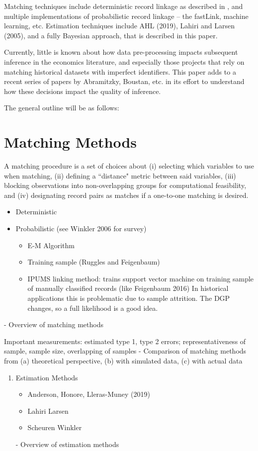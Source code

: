 \documentclass[12pt]{article}
\begin{document}
\begin{Introduction}
Matching techniques include deterministic record linkage as described in \cite{}, and multiple implementations of probabilistic record linkage -- the fastLink, machine learning, etc. Estimation techniques include AHL (2019), Lahiri and Larsen (2005), and a fully Bayesian approach, that is described in this paper. 

Currently, little is known about how data pre-processing impacts subsequent inference in the economics literature, and especially those projects that rely on matching historical datasets with imperfect identifiers.  This paper adds to a recent series of papers by Abramitzky, Boustan, etc.  in its effort to understand how these decisions impact the quality of inference. 

The general outline will be as follows:


\section{Matching Methods}

A matching procedure is a set of choices about (i) selecting which variables to use when matching, (ii) defining a ``distance" metric between said variables, (iii) blocking observations into non-overlapping groups for computational feasibility, and (iv) designating record pairs as matches if a one-to-one matching is desired. 
\begin{itemize}
\item Deterministic
\item Probabilistic  (see Winkler 2006 for survey)
\begin{itemize}
\item E-M Algorithm
\item Training sample (Ruggles and Feigenbaum)
\item IPUMS linking method:  trains support vector machine on training sample of manually classified records (like Feigenbaum 2016)  In historical applications this is problematic due to sample attrition.  The DGP changes, so a full likelihood is a good idea. 
\end{itemize}
\end{itemize}
- Overview of matching methods

Important measurements:  estimated type 1, type 2 errors; representativeness of sample, sample size, overlapping of samples 
- Comparison of matching methods from (a) theoretical perspective, (b) with simulated data, (c) with actual data
\begin{enumerate}
\item  Estimation Methods 
\begin{itemize}
\item Anderson, Honore, Lleras-Muney (2019)
\item Lahiri Larsen
\item Scheuren Winkler 
\end{itemize}
- Overview of estimation methods


\end{enumerate}
\end{Introduction}
\end{document}
